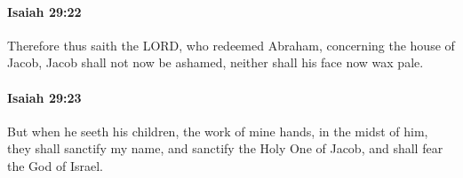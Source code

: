 		\paragraph{Isaiah 29:22} %
			\label{ISAIAH-29-22}

			Therefore thus saith the LORD, who redeemed Abraham, concerning the house of Jacob, Jacob shall not now be ashamed, neither shall his face now wax pale.


		\paragraph{Isaiah 29:23} %
			\label{ISAIAH-29-23}

			But when he seeth his children, the work of mine hands, in the midst of him, they shall sanctify my name, and sanctify the Holy One of Jacob, and shall fear the God of Israel.



